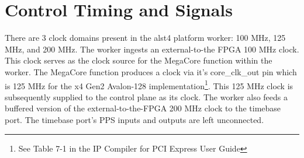 \documentclass{article}
\begin{document}
\section*{Control Timing and Signals}
	There are 3 clock domains present in the alst4 platform worker: 100 MHz, 125 MHz, and 200 MHz. The worker ingests an external-to-the FPGA 100 MHz clock. This clock serves as the clock source for the MegaCore function within the worker. The MegaCore function produces a clock via it's core\_clk\_out pin which is 125 MHz for the x4 Gen2 Avalon-128 implementation\footnote{See Table 7-1 in the IP Compiler for PCI Express User Guide}. This 125 MHz clock is subsequently supplied to the control plane as its clock. The worker also feeds a buffered version of the external-to-the-FPGA 200 MHz clock to the timebase port. The timebase port's PPS inputs and outputs are left unconnected.
\end{document}
